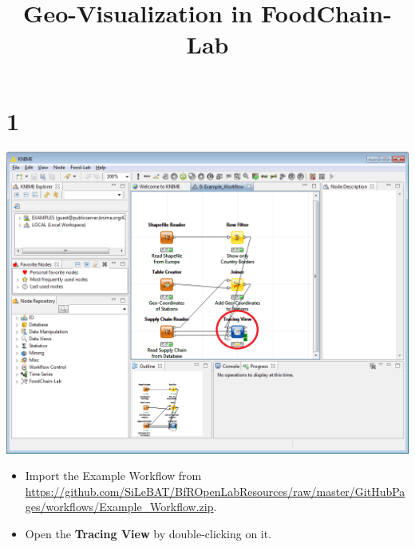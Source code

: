 \documentclass{beamer}
\title{Geo-Visualization in FoodChain-Lab}
\date{}
\begin{document}
\maketitle
 
\section{1}
\begin{frame}
	\begin{center}
  		\includegraphics[height=0.6\textheight]{1.png}
	\end{center}
	\begin{itemize}
		\item Import the Example Workflow from \url{https://github.com/SiLeBAT/BfROpenLabResources/raw/master/GitHubPages/workflows/Example_Workflow.zip}.
		\item Open the \textbf{Tracing View} by double-clicking on it.
	\end{itemize}
\end{frame}
\end{document}
